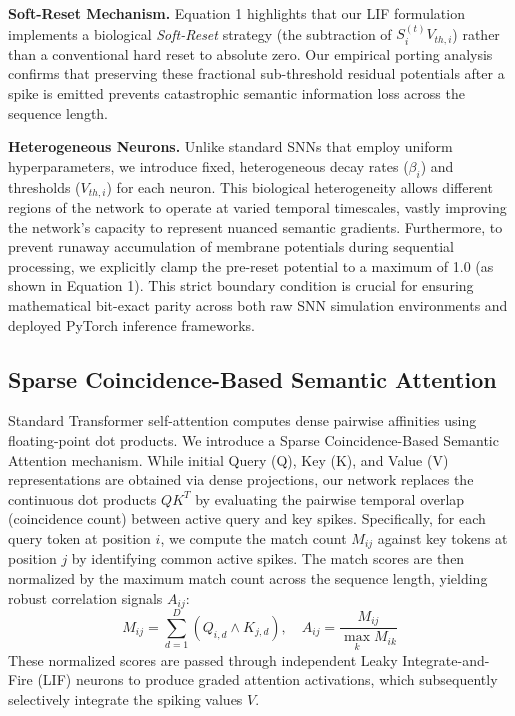 \documentclass{article} %
\begin{document}
\textbf{Soft-Reset Mechanism.} Equation 1 highlights that our LIF formulation implements a biological \textit{Soft-Reset} strategy (the subtraction of $S_i^{(t)} V_{th, i}$) rather than a conventional hard reset to absolute zero. Our empirical porting analysis confirms that preserving these fractional sub-threshold residual potentials after a spike is emitted prevents catastrophic semantic information loss across the sequence length.

\textbf{Heterogeneous Neurons.} Unlike standard SNNs that employ uniform hyperparameters, we introduce fixed, heterogeneous decay rates ($\beta_i$) and thresholds ($V_{th, i}$) for each neuron. This biological heterogeneity allows different regions of the network to operate at varied temporal timescales, vastly improving the network's capacity to represent nuanced semantic gradients. Furthermore, to prevent runaway accumulation of membrane potentials during sequential processing, we explicitly clamp the pre-reset potential to a maximum of 1.0 (as shown in Equation 1). This strict boundary condition is crucial for ensuring mathematical bit-exact parity across both raw SNN simulation environments and deployed PyTorch inference frameworks.

\subsection{Sparse Coincidence-Based Semantic Attention}
Standard Transformer self-attention computes dense pairwise affinities using floating-point dot products. We introduce a Sparse Coincidence-Based Semantic Attention mechanism. While initial Query (Q), Key (K), and Value (V) representations are obtained via dense projections, our network replaces the continuous dot products $Q K^T$ by evaluating the pairwise temporal overlap (coincidence count) between active query and key spikes. Specifically, for each query token at position $i$, we compute the match count $M_{ij}$ against key tokens at position $j$ by identifying common active spikes. The match scores are then normalized by the maximum match count across the sequence length, yielding robust correlation signals $A_{ij}$:
\begin{equation}
M_{ij} = \sum_{d=1}^{D} (Q_{i,d} \wedge K_{j,d}), \quad A_{ij} = \frac{M_{ij}}{\max_{k} M_{ik}}
\end{equation}
These normalized scores are passed through independent Leaky Integrate-and-Fire (LIF) neurons to produce graded attention activations, which subsequently selectively integrate the spiking values $V$.
\end{document}
